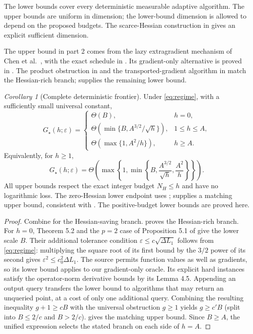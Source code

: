 \documentclass[11pt]{article}
\newtheorem{corollary}[theorem]{Corollary}
\theoremstyle{remark}
\newtheorem{corollary}[corollary]{Corollary}
\theoremstyle{remark}
\newcommand{\eps}{\varepsilon}
\newcommand{\G}{G_\star}
\begin{document}
The lower bounds cover every deterministic measurable adaptive algorithm. The upper bounds are uniform in dimension; the lower-bound dimension is allowed to depend on the proposed budgets. The scarce-Hessian construction in  gives an explicit sufficient dimension.

The upper bound in part 2 comes from the lazy extragradient mechanism of Chen et al.~\cite{chen}, with the exact schedule in . Its gradient-only alternative is proved in . The product obstruction in  and the transported-gradient algorithm in  match the Hessian-rich branch;  supplies the remaining lower bound.

\begin{corollary}[Complete deterministic frontier]\label{cor:complete-frontier}
Under \eqref{eq:regime}, with a sufficiently small universal constant,
\begin{equation}\label{eq:complete-frontier}
 \G(h;\eps)=\begin{cases}
 \Theta(B),&h=0,\\[2pt]
 \Theta\!\left(\min\{B,A^{3/2}/\sqrt h\}\right),&1\le h\le A,\\[2pt]
 \Theta\!\left(\max\{1,A^2/h\}\right),&h\ge A.
 \end{cases}
\end{equation}
Equivalently, for $h\ge1$,
\begin{equation}\label{eq:unified-frontier}
 \G(h;\eps)=\Theta\!\left(
 \max\left\{1,\min\left\{B,\frac{A^{3/2}}{\sqrt h},\frac{A^2}{h}\right\}\right\}
 \right).
\end{equation}
All upper bounds respect the exact integer budget $N_H\le h$ and have no logarithmic loss. The zero-Hessian lower endpoint uses \cite{zhou};  supplies a matching upper bound, consistent with \cite{lilin}. The positive-budget lower bounds are proved here.
\end{corollary}
\begin{proof}
Combine  for the Hessian-saving branch.  proves the Hessian-rich branch. For $h=0$, Theorem 5.2 and the $p=2$ case of Proposition 5.1 of \cite{zhou} give the lower scale $B$. Their additional tolerance condition $\eps\le c\sqrt{\Delta L_1}$ follows from \eqref{eq:regime}: multiplying the square root of its first bound by the $3/2$ power of its second gives $\eps^2\le c_0^2\Delta L_1$. The source permits function values as well as gradients, so its lower bound applies to our gradient-only oracle. Its explicit hard instances satisfy the operator-norm derivative bounds by its Lemma 4.5. Appending an output query transfers the lower bound to algorithms that may return an unqueried point, at a cost of only one additional query. Combining the resulting inequality $g+1\ge cB$ with the universal obstruction $g\ge1$ yields $g\ge c'B$ (split into $B\le2/c$ and $B>2/c$).  gives the matching upper bound. Since $B\ge A$, the unified expression selects the stated branch on each side of $h=A$.
\end{proof}
\end{document}
